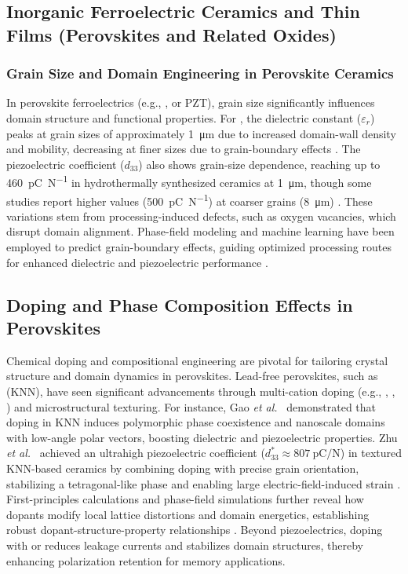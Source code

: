 \documentclass[a4paper,fleqn]{cas-sc}
\begin{document}
\subsection*{Inorganic Ferroelectric Ceramics and Thin Films (Perovskites and Related Oxides)}
\subsubsection*{Grain Size and Domain Engineering in Perovskite Ceramics}

\par In perovskite ferroelectrics (e.g., ,  or PZT), grain size significantly influences domain structure and functional properties. For , the dielectric constant (\(\varepsilon_r\)) peaks at grain sizes of approximately \SI{1}{\micro\meter} due to increased domain-wall density and mobility, decreasing at finer sizes due to grain-boundary effects \cite{tan2015unfolding}. The piezoelectric coefficient (\(d_{33}\)) also shows grain-size dependence, reaching up to \SI{460}{\pico\coulomb\per\newton} in hydrothermally synthesized ceramics at \SI{1}{\micro\meter}, though some studies report higher values (\SI{500}{\pico\coulomb\per\newton}) at coarser grains (\SI{8}{\micro\meter}) \cite{tan2015unfolding}. These variations stem from processing-induced defects, such as oxygen vacancies, which disrupt domain alignment. Phase-field modeling and machine learning have been employed to predict grain-boundary effects, guiding optimized processing routes for enhanced dielectric and piezoelectric performance \cite{tan2015unfolding}.
\subsection*{Doping and Phase Composition Effects in Perovskites}

\par Chemical doping and compositional engineering are pivotal for tailoring crystal structure and domain dynamics in perovskites. Lead-free perovskites, such as  (KNN), have seen significant advancements through multi-cation doping (e.g., , , ) and microstructural texturing. For instance, Gao \textit{et al.}~\cite{gao2021mechanism} demonstrated that  doping in KNN induces polymorphic phase coexistence and nanoscale domains with low-angle polar vectors, boosting dielectric and piezoelectric properties. Zhu \textit{et al.}~\cite{zhu2025ultrahigh} achieved an ultrahigh piezoelectric coefficient (\(d^*_{33} \approx \SI{807}{\pico\coulomb\per\newton}\)) in textured KNN-based ceramics by combining  doping with precise grain orientation, stabilizing a tetragonal-like phase and enabling large electric-field-induced strain \cite{zhu2025ultrahigh}. First-principles calculations and phase-field simulations further reveal how dopants modify local lattice distortions and domain energetics, establishing robust dopant-structure-property relationships \cite{gao2021mechanism}. Beyond piezoelectrics, doping  with  or  reduces leakage currents and stabilizes domain structures, thereby enhancing polarization retention for memory applications.
\end{document}
